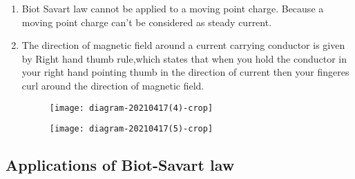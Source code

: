\begin{note}
	\begin{enumerate}
		\item Biot Savart law cannot be applied to a moving point charge.  Because a moving point charge can't be considered as steady current.
		
		\item The direction of magnetic field around a current carrying conductor is given by Right hand thumb rule,which states that when you hold the conductor in your right hand pointing thumb in the direction of current then your fingeres curl around the direction of magnetic field.\\
		
		
		\begin{figure}[H]
			\begin{minipage}{0.45\textwidth}
				\centering
				\texttt{[image: diagram-20210417(4)-crop]}
			\end{minipage}
			\begin{minipage}{0.45\textwidth}
				\centering
				\texttt{[image: diagram-20210417(5)-crop]}
			\end{minipage}
			\caption{}
			\label{parellel}
		\end{figure}	 
	\end{enumerate}
	
\end{note}

\subsection{Applications of Biot-Savart law}
